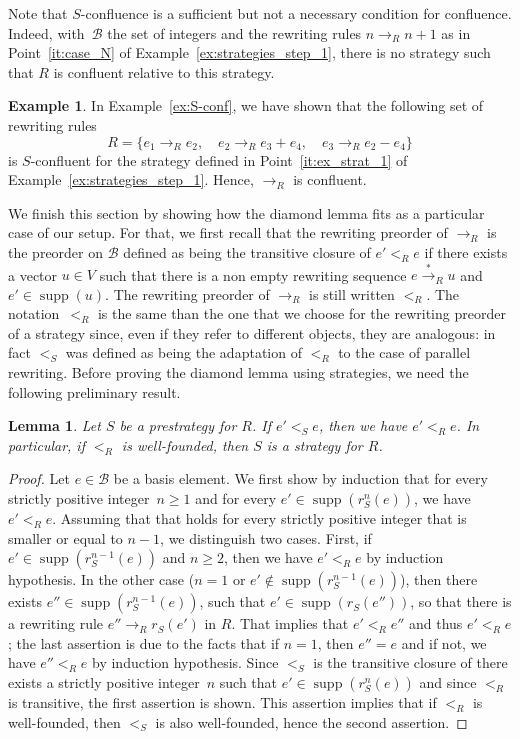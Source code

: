 \documentclass[11pt]{article}
\newtheorem{lemma}[theorem]{Lemma}
\theoremstyle{definition}
\newtheorem{example}[theorem]{Example}
\newcommand\basis{\mathscr{B}}
\newcommand\ordS{<_S}
\newcommand\ordR{<_R}
\DeclareMathOperator{\supp}{supp}
\newcommand\rewR{\to_R}
\newcommand\transR{\overset{*}{\to}_R}
\begin{document}
Note that $S$-confluence is a sufficient but not a necessary condition for
confluence. Indeed, with~$\basis$ the set of integers and the rewriting rules
$n\rewR n+1$ as in Point~\ref{it:case_N} of
Example~\ref{ex:strategies_step_1}, there is no strategy such that $R$ is
confluent relative to this strategy.
\smallskip

\begin{example}\label{ex:conf}
  In Example~\ref{ex:S-conf}, we have shown that the following set of
  rewriting rules
  \[R=\{e_1\rewR e_2,\quad e_2\rewR e_3+e_4,\quad e_3\rewR e_2-e_4\}\]
  is $S$-confluent for the strategy defined in Point~\ref{it:ex_strat_1}
  of Example~\ref{ex:strategies_step_1}. Hence, $\rewR$ is confluent.
\end{example}
\smallskip

We finish this section by showing how the diamond lemma fits as a
particular case of our setup. For that, we first recall that the
rewriting preorder of $\rewR$ is the preorder on $\basis$ defined as
being the transitive closure of $e'\ordR e$ if there exists a vector
$u\in V$ such that there is a non empty rewriting sequence $e\transR u$
and $e'\in\supp(u)$. The rewriting preorder of $\rewR$ is still written
$\ordR$. The notation~$\ordR$ is the same than the one that we choose for
the rewriting preorder of a strategy since, even if they refer to
different objects, they are analogous: in fact $\ordS$ was defined as
being the adaptation of $\ordR$ to the case of parallel rewriting. Before
proving the diamond lemma using strategies, we need the following
preliminary result.
\smallskip

\begin{lemma}\label{lem:rew_preorder}
  Let $S$ be a prestrategy for $R$. If $e'\ordS e$, then we have
  $e'\ordR e$. In particular, if $\ordR$ is well-founded, then $S$ is a
  strategy for $R$.
\end{lemma}


\begin{proof}
  Let $e\in\basis$ be a basis element. We first show by induction that
  for every strictly positive integer~$n\geq 1$ and for every
  $e'\in\supp(r_S^n(e))$, we have $e'\ordR e$. Assuming that that holds
  for every strictly positive integer that is smaller or equal to $n-1$,
  we distinguish two cases. First, if $e'\in\supp(r_S^{n-1}(e))$ and
  $n\geq 2$, then we have $e'<_Re$ by induction hypothesis. In the other
  case ($n=1$ or $e'\notin\supp(r_S^{n-1}(e))$), then there exists
  $e''\in\supp(r_S^{n-1}(e))$, such that $e'\in\supp(r_S(e''))$, so that
  there is a rewriting rule $e''\rewR r_S(e')$ in $R$. That implies that
  $e'<_Re''$ and thus $e'<_Re$; the last assertion is due to the facts
  that if $n=1$, then $e''=e$ and if not, we have $e''<_Re$ by induction
  hypothesis. Since $\ordS$ is the transitive closure of there exists a
  strictly positive integer~$n$ such that $e'\in\supp(r_S^n(e))$ and
  since $\ordR$ is transitive, the first assertion is shown. This
  assertion implies that if $\ordR$ is well-founded, then $\ordS$ is also
  well-founded, hence the second assertion.
\end{proof}
\smallskip
\end{document}
